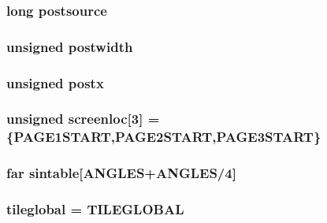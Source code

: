 \label{WL__DRAW_8C_a2f208ffbe5bce68b88b0be14b31b646e}
\hypertarget{WL__DRAW_8C_a5c3da61f4f3a18106264fea7208c84cd}{
\subsubsection[{postsource}]{\setlength{\rightskip}{0pt plus 5cm}long {\bf postsource}}}
\label{WL__DRAW_8C_a5c3da61f4f3a18106264fea7208c84cd}
\hypertarget{WL__DRAW_8C_a9cdf6d376906876ee5303bf1c419c053}{
\subsubsection[{postwidth}]{\setlength{\rightskip}{0pt plus 5cm}unsigned {\bf postwidth}}}
\label{WL__DRAW_8C_a9cdf6d376906876ee5303bf1c419c053}
\hypertarget{WL__DRAW_8C_a04274d2d5024d95f76a7c66cc176f0e2}{
\subsubsection[{postx}]{\setlength{\rightskip}{0pt plus 5cm}unsigned {\bf postx}}}
\label{WL__DRAW_8C_a04274d2d5024d95f76a7c66cc176f0e2}
\hypertarget{WL__DRAW_8C_a7f19075ffe97f9380ab35be486017cd0}{
\subsubsection[{screenloc}]{\setlength{\rightskip}{0pt plus 5cm}unsigned {\bf screenloc}\mbox{[}3\mbox{]} = \{PAGE1START,PAGE2START,PAGE3START\}}}
\label{WL__DRAW_8C_a7f19075ffe97f9380ab35be486017cd0}
\hypertarget{WL__DRAW_8C_a26ed7ba128175f995c2eb9f38f2590bd}{
\subsubsection[{sintable}]{ far {\bf sintable}\mbox{[}ANGLES+ANGLES/4\mbox{]}}}
\label{WL__DRAW_8C_a26ed7ba128175f995c2eb9f38f2590bd}
\hypertarget{WL__DRAW_8C_ab864b51e17df4138d9cb8e5549825c3f}{
\subsubsection[{tileglobal}]{ {\bf tileglobal} = TILEGLOBAL}}
